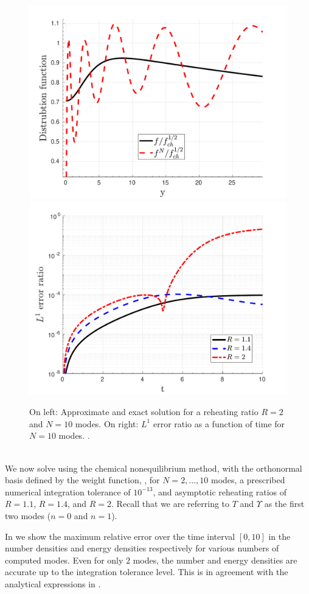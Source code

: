 \begin{figure}
\centerline{\includegraphics[width=0.5\linewidth]{plots/free_stream_approx_T_r_2.pdf}\hspace{-0.5cm}
\includegraphics[width=0.5\linewidth]{plots/free_stream_L1_err_time.pdf}}
\caption{On left: Approximate and exact solution for a reheating ratio $R=2$ and $N=10$ modes. On right: $L^1$ error ratio as a function of time for $N=10$ modes. .}\label{fig:freeStreamApproxTr2}
 \end{figure}
 

\\
We now solve   using the chemical nonequilibrium method, with the orthonormal basis defined by the weight function, , for $N=2,...,10$ modes, a prescribed numerical integration tolerance of $10^{-13}$, and asymptotic reheating ratios of $R=1.1$, $R=1.4$, and $R=2$.  Recall that we are referring to $T$ and $\Upsilon$ as the first two modes ($n=0$ and $n=1$). 

 
In   
we show the maximum relative error over the time interval $[0,10]$ in the number densities and energy densities respectively for various numbers of computed modes. Even for only $2$ modes, the number and energy densities are accurate up to the integration tolerance level. This is in agreement with the analytical expressions in .


